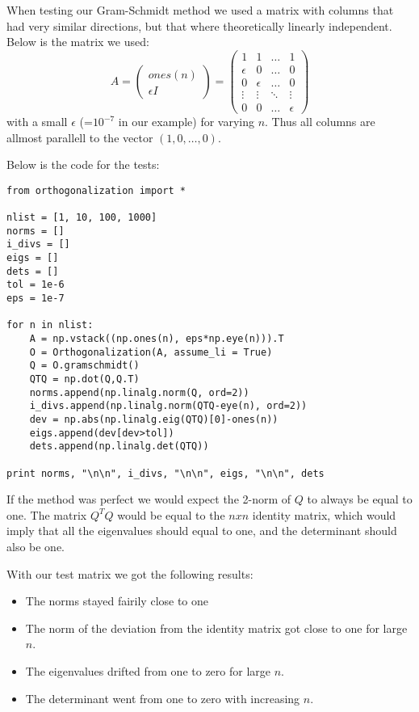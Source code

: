 \documentclass[a4paper]{article}
\begin{document}
\begin{description}
When testing our Gram-Schmidt method we used a matrix with columns that had very similar directions, but that where theoretically linearly independent. Below is the matrix we used:
\begin{equation}
A = 
\begin{pmatrix}
ones(n) \\ \epsilon I
\end{pmatrix}
=
\begin{pmatrix}
1 & 1 & \ldots & 1 \\
\epsilon & 0 & \ldots & 0 \\
0 & \epsilon & \ldots & 0 \\
\vdots & \vdots & \ddots & \vdots \\
0 & 0 & \ldots & \epsilon
\end{pmatrix}
\end{equation}
with a small $\epsilon$ (=$10^{-7}$ in our example) for varying $n$. Thus all columns are allmost parallell to the vector $(1, 0, \ldots, 0)$.

Below is the code for the tests:

\begin{lstlisting}
from orthogonalization import *

nlist = [1, 10, 100, 1000]
norms = []
i_divs = []
eigs = []
dets = []
tol = 1e-6
eps = 1e-7

for n in nlist:
    A = np.vstack((np.ones(n), eps*np.eye(n))).T  
    O = Orthogonalization(A, assume_li = True)
    Q = O.gramschmidt()
    QTQ = np.dot(Q,Q.T)
    norms.append(np.linalg.norm(Q, ord=2))
    i_divs.append(np.linalg.norm(QTQ-eye(n), ord=2))
    dev = np.abs(np.linalg.eig(QTQ)[0]-ones(n))
    eigs.append(dev[dev>tol])
    dets.append(np.linalg.det(QTQ))

print norms, "\n\n", i_divs, "\n\n", eigs, "\n\n", dets
\end{lstlisting}

If the method was perfect we would expect the 2-norm of $Q$ to always be equal to one. The matrix $Q^TQ$ would be equal to the $n x n$ identity matrix, which would imply that all the eigenvalues should equal to one, and the determinant should also be one.

With our test matrix we got the following results:
\begin{itemize}
\item{} The norms stayed fairily close to one
\item{} The norm of the deviation from the identity matrix got close to one for large $n$.
\item{} The eigenvalues drifted from one to zero for large $n$.
\item{} The determinant went from one to zero with increasing $n$.
\end{itemize}


\end{description}
\end{document}
